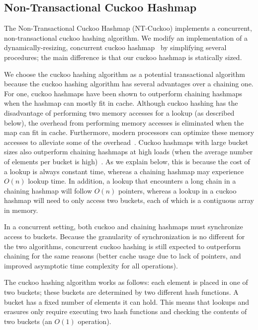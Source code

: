 \subsection{Non-Transactional Cuckoo Hashmap}
\label{section:ntchm_algo}
The Non-Transactional Cuckoo Hashmap (NT-Cuckoo) implements a concurrent, non-transactional cuckoo hashing algorithm. We modify an implementation of a dynamically-resizing, concurrent cuckoo hashmap~\cite{cuckoocode} by simplifying several procedures; the main difference is that our cuckoo hashmap is statically sized.

We choose the cuckoo hashing algorithm as a potential transactional algorithm because the cuckoo hashing algorithm has several advantages over a chaining one. For one, cuckoo hashmaps have been shown to outperform chaining hashmaps when the hashmap can mostly fit in cache. Although cuckoo hashing has the disadvantage of performing two memory accesses for a lookup (as described below), the overhead from performing memory accesses is eliminated when the map can fit in cache.
Furthermore, modern processors can optimize these memory accesses to alleviate some of the overhead~\cite{chm_arch}.
Cuckoo hashmaps with large bucket sizes also outperform chaining hashmaps at high loads (when the average number of elements per bucket is high)~\cite{chm_load}. As we explain below, this is because the cost of a lookup is always constant time, whereas a chaining hashmap may experience $O(n)$ lookup time. In addition, a lookup that encounters a long chain in a chaining hashmap will follow $O(n)$ pointers, whereas a lookup in a cuckoo hashmap will need to only access two buckets, each of which is a contiguous array in memory.

In a concurrent setting, both cuckoo and chaining hashmaps must synchronize access to buckets. Because the granularity of synchronization is no different for the two algorithms, concurrent cuckoo hashing is still expected to outperform chaining for the same reasons (better cache usage due to lack of pointers, and improved asymptotic time complexity for all operations).

The cuckoo hashing algorithm works as follows: each element is placed in one of two buckets; these buckets are determined by two different hash functions. A bucket has a fixed number of elements it can hold. This means that lookups and erasures only require executing two hash functions and checking the contents of two buckets (an $O(1)$ operation).

